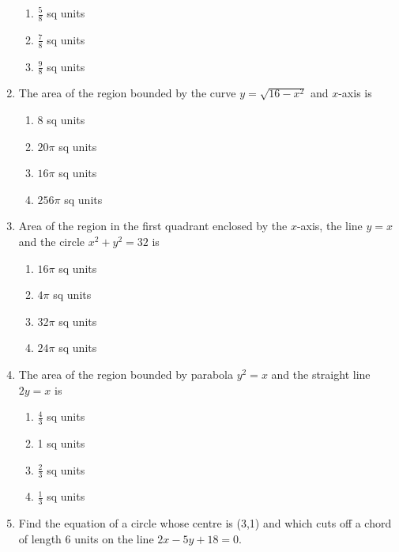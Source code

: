 \begin{enumerate}[label=\thesubsection.\arabic*,ref=\thesubsection.\theenumi]
\begin{enumerate}
\item $\frac{5}{8}$ sq units
\item $\frac{7}{8}$ sq units 
\item $\frac{9}{8}$ sq units
\end{enumerate}
\item The area of the region bounded by the curve $y = \sqrt{16 - x^2}$ and $x$-axis is 
\begin{enumerate}
\item 8 sq units 
\item ${20\pi}$ sq units
\item ${16\pi}$ sq units
\item ${256\pi}$ sq units
\end{enumerate}
\item Area of the region in the first quadrant enclosed by the $x$-axis, the line $y = x$ and the circle $x^2 + y^2 = 32$ is 
\begin{enumerate}
\item ${16\pi}$ sq units 
\item ${4\pi}$ sq units
\item ${32\pi}$ sq units
\item ${24\pi}$ sq units
\end{enumerate}
\item The area of the region bounded by parabola $y^2 = x$ and the straight line $2y = x$ is
\begin{enumerate}
\item $\frac{4}{3}$ sq units
\item 1 sq units
\item $\frac{2}{3}$ sq units 
\item $\frac{1}{3}$ sq units
\end{enumerate}
\item Find the equation of a circle whose centre is (3,1) and which cuts off a chord of length  6 units on the  line $2x-5y+18=0$.
\end{enumerate}
